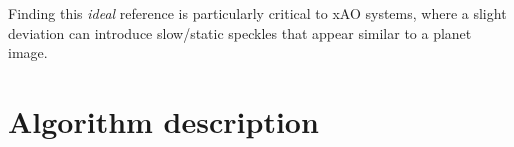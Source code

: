 \documentclass[twocolumn]{aa}
\newcommand{\og}[2]{\textcolor{orange}{\sout{#1} {#2}}}
\begin{document}
Finding this \textit{ideal} reference is particularly critical to xAO systems, where a slight deviation can introduce slow/static speckles that appear similar to a planet image.\\







\section{Algorithm description}\label{sec:algo_des}
\end{document}
